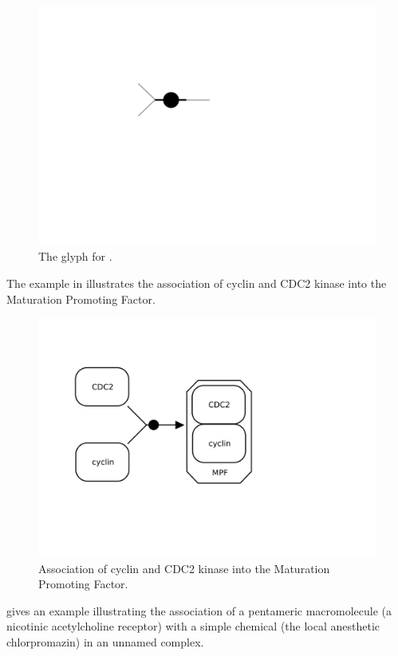 \begin{figure}[htb]
  \centering
  \includegraphics[scale = 0.5]{images/association}
  \caption{The \PD glyph for .}
  \label{fig:techref:association}
\end{figure}

The example in  illustrates the association of cyclin and CDC2 kinase into the Maturation Promoting Factor.

\begin{figure}[htb]
  \centering
  \includegraphics[scale = 0.3]{examples/association-MPF}
  \caption{Association of cyclin and CDC2 kinase into the Maturation Promoting Factor.}
  \label{fig:techref:assoc-cyclin}
\end{figure}

 gives an example illustrating the association of a pentameric macromolecule (a nicotinic acetylcholine receptor) with a simple chemical (the local anesthetic chlorpromazin) in an unnamed complex.

